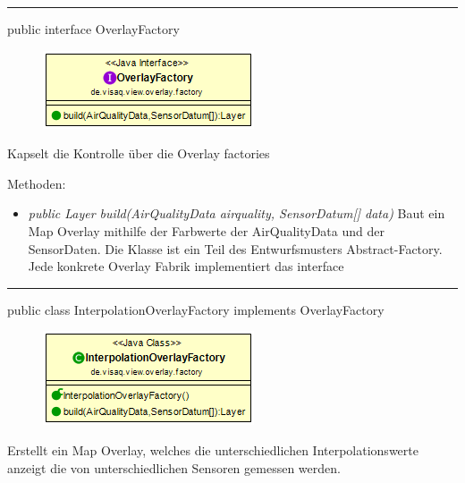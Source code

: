 
\rule{\textwidth}{0.4pt}
public interface OverlayFactory

\begin{minipage}{0.3\textwidth}
    \begin{figure}[H]
        \includegraphics[scale = 0.5
        ]{media/frontend/view/de.view.overlay.factory/OverlayFactory_Class.png}
    \end{figure}
    \end{minipage} \hfill
    \begin{minipage}{0.6\textwidth}
Kapselt die Kontrolle über die Overlay factories
\end{minipage}

Methoden:
\begin{itemize}
    \item \emph{public Layer build(AirQualityData airquality, SensorDatum[] data)}  Baut ein Map Overlay mithilfe der Farbwerte der AirQualityData und der SensorDaten. Die Klasse ist ein Teil des Entwurfsmusters Abstract-Factory. Jede konkrete Overlay Fabrik implementiert das interface
\end{itemize}

\rule{\textwidth}{0.4pt}
public class InterpolationOverlayFactory implements OverlayFactory

\begin{minipage}{0.3\textwidth}
    \begin{figure}[H]
        \includegraphics[scale = 0.5]{media/frontend/view/de.view.overlay.factory/InterpolationOverlayFactory_Class.png}
    \end{figure}
    \end{minipage} \hfill
    \begin{minipage}{0.6\textwidth}
Erstellt ein Map Overlay, welches die unterschiedlichen Interpolationswerte anzeigt die von unterschiedlichen Sensoren gemessen werden.
\end{minipage}

